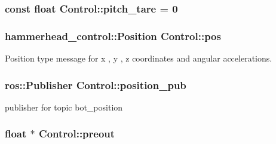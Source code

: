\subsubsection[{\texorpdfstring{pitch\+\_\+tare}{pitch_tare}}]{\setlength{\rightskip}{0pt plus 5cm}const float Control\+::pitch\+\_\+tare = 0\hspace{0.3cm}{\ttfamily [private]}}\hypertarget{classControl_a918db5567eafcc94052d8f41f94f462e}{}\label{classControl_a918db5567eafcc94052d8f41f94f462e}
\subsubsection[{\texorpdfstring{pos}{pos}}]{\setlength{\rightskip}{0pt plus 5cm}hammerhead\+\_\+control\+::\+Position Control\+::pos\hspace{0.3cm}{\ttfamily [private]}}\hypertarget{classControl_a01d178fc453eb32517b91e771ef0c865}{}\label{classControl_a01d178fc453eb32517b91e771ef0c865}


Position type message for x , y , z coordinates and angular accelerations. 

\subsubsection[{\texorpdfstring{position\+\_\+pub}{position_pub}}]{\setlength{\rightskip}{0pt plus 5cm}ros\+::\+Publisher Control\+::position\+\_\+pub\hspace{0.3cm}{\ttfamily [private]}}\hypertarget{classControl_ae5593e99df99f6e78c3c3fba9cefa187}{}\label{classControl_ae5593e99df99f6e78c3c3fba9cefa187}


publisher for topic bot\+\_\+position 

\subsubsection[{\texorpdfstring{preout}{preout}}]{\setlength{\rightskip}{0pt plus 5cm}float $\ast$ Control\+::preout\hspace{0.3cm}{\ttfamily [private]}}\hypertarget{classControl_a68319ff62b7b0a0f2034e6daf6a79aa3}{}\label{classControl_a68319ff62b7b0a0f2034e6daf6a79aa3}
